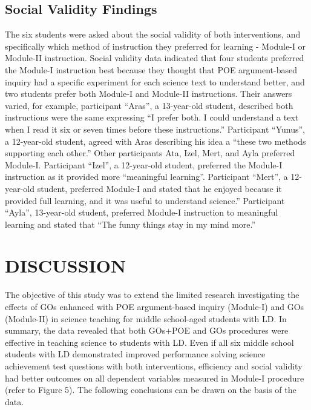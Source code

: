 \documentclass[11.5pt]{sig-alternate} %
\begin{document}
\begin{large}
\subsection*{Social Validity Findings}
The six students were asked about the social validity of both interventions, and specifically which method of instruction they preferred for learning - Module-I or Module-II instruction. Social validity data indicated that four students preferred the Module-I instruction best because they thought that POE argument-based inquiry had a specific experiment for each science text to understand better, and two students prefer both Module-I and Module-II instructions. Their answers varied, for example, participant “Aras”, a 13-year-old student, described both instructions were the same expressing “I prefer both. I could understand a text when I read it six or seven times before these instructions.” Participant “Yunus”, a 12-year-old student, agreed with Aras describing his idea a “these two methods supporting each other.” Other participants Ata, Izel, Mert, and Ayla preferred Module-I. Participant “Izel”, a 12-year-old student, preferred the Module-I instruction as it provided more “meaningful learning”. Participant “Mert”, a 12-year-old student, preferred Module-I and stated that he enjoyed because it provided full learning, and it was useful to understand science.” Participant “Ayla”, 13-year-old student, preferred Module-I instruction to meaningful learning and stated that “The funny things stay in my mind more.” 

\section*{DISCUSSION}
The objective of this study was to extend the limited research investigating the effects of GOs enhanced with POE argument-based inquiry (Module-I) and GOs (Module-II) in science teaching for middle school-aged students with LD. In summary, the data revealed that both GOs+POE and GOs procedures were effective in teaching science to students with LD. Even if all six middle school students with LD demonstrated improved performance solving science achievement test questions with both interventions, efficiency and social validity had better outcomes on all dependent variables measured in Module-I procedure (refer to Figure 5). The following conclusions can be drawn on the basis of the data.


\end{large}
\end{document}
